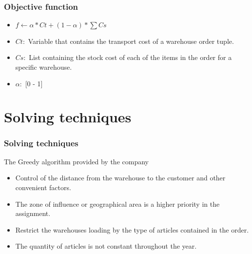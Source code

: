 \documentclass[t,compress,11pt,xcolor=dvipsnames,pdf,english]{beamer}
\begin{document}
\begin{frame}[c]{ }
    \frametitle{Objective function}

        \begin{itemize}
            \item $f \longleftarrow \alpha * Ct + (1 - \alpha) * \sum Cs$
            \item $Ct :$ Variable that contains the transport cost of a warehouse order tuple.
            \item $Cs :$ List containing the stock cost of each of the items in the order for a specific warehouse.
            \item $\alpha :$ [0 - 1]

        \end{itemize}

\end{frame}
\section{Solving techniques}


\begin{frame}[c]{ }
\frametitle{Solving techniques}
    \large
    The Greedy algorithm provided by the company
    \normalsize
    
    \begin{itemize}
        \item Control of the distance from the warehouse to the customer and other convenient factors.
        \item The zone of influence or geographical area is a higher priority in the assignment.
        \item Restrict the warehouses loading by the type of articles contained in the order.
        \item The quantity of articles is not constant throughout the year.
    \end{itemize}
\end{frame}
\end{document}

